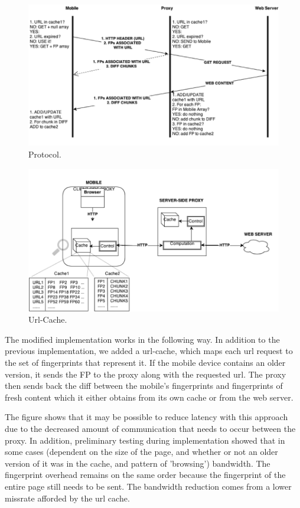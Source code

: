 \begin{figure}[h] 
\centering \includegraphics[scale=0.40]{images/urlcache-protocol.png}
\caption{Protocol. }
\end{figure} 

\begin{figure}[h] 
\centering \includegraphics[scale=0.40]{images/url-cache-hl.png}
\caption{Url-Cache. }
\end{figure} 

The modified implementation works in the following way. In addition to the previous implementation, we added a url-cache, which maps each url request to the set of fingerprints that represent it. If the mobile device contains an older version, it sends the FP to the proxy along with the requested url. The proxy then sends back the diff between the mobile's fingerprints and fingerprints of fresh content which it either obtains from its own cache or from the web server. 

The figure shows that it may be possible to reduce latency with this approach due to the decreased amount of communication that needs to occur between the proxy. In addition, preliminary testing during implementation showed that in some cases (dependent on the size of the page, and whether or not an older version of it was in the cache, and pattern of 'browsing') bandwidth. The fingerprint overhead remains on the same order because the fingerprint of the entire page still needs to be sent. The bandwidth reduction comes from a lower missrate afforded by the url cache.  

